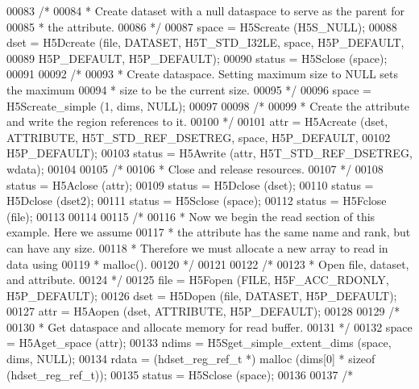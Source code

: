 \begin{DoxyCode}
00083     \textcolor{comment}{/*}
00084 \textcolor{comment}{     * Create dataset with a null dataspace to serve as the parent for}
00085 \textcolor{comment}{     * the attribute.}
00086 \textcolor{comment}{     */}
00087     space = H5Screate (H5S\_NULL);
00088     dset = H5Dcreate (file, DATASET, H5T\_STD\_I32LE, space, H5P\_DEFAULT,
00089                 H5P\_DEFAULT, H5P\_DEFAULT);
00090     status = H5Sclose (space);
00091 
00092     \textcolor{comment}{/*}
00093 \textcolor{comment}{     * Create dataspace.  Setting maximum size to NULL sets the maximum}
00094 \textcolor{comment}{     * size to be the current size.}
00095 \textcolor{comment}{     */}
00096     space = H5Screate\_simple (1, dims, NULL);
00097 
00098     \textcolor{comment}{/*}
00099 \textcolor{comment}{     * Create the attribute and write the region references to it.}
00100 \textcolor{comment}{     */}
00101     attr = H5Acreate (dset, ATTRIBUTE, H5T\_STD\_REF\_DSETREG, space, H5P\_DEFAULT,
00102                     H5P\_DEFAULT);
00103     status = H5Awrite (attr, H5T\_STD\_REF\_DSETREG, wdata);
00104 
00105     \textcolor{comment}{/*}
00106 \textcolor{comment}{     * Close and release resources.}
00107 \textcolor{comment}{     */}
00108     status = H5Aclose (attr);
00109     status = H5Dclose (dset);
00110     status = H5Dclose (dset2);
00111     status = H5Sclose (space);
00112     status = H5Fclose (file);
00113 
00114 
00115     \textcolor{comment}{/*}
00116 \textcolor{comment}{     * Now we begin the read section of this example.  Here we assume}
00117 \textcolor{comment}{     * the attribute has the same name and rank, but can have any size.}
00118 \textcolor{comment}{     * Therefore we must allocate a new array to read in data using}
00119 \textcolor{comment}{     * malloc().}
00120 \textcolor{comment}{     */}
00121 
00122     \textcolor{comment}{/*}
00123 \textcolor{comment}{     * Open file, dataset, and attribute.}
00124 \textcolor{comment}{     */}
00125     file = H5Fopen (FILE, H5F\_ACC\_RDONLY, H5P\_DEFAULT);
00126     dset = H5Dopen (file, DATASET, H5P\_DEFAULT);
00127     attr = H5Aopen (dset, ATTRIBUTE, H5P\_DEFAULT);
00128 
00129     \textcolor{comment}{/*}
00130 \textcolor{comment}{     * Get dataspace and allocate memory for read buffer.}
00131 \textcolor{comment}{     */}
00132     space = H5Aget\_space (attr);
00133     ndims = H5Sget\_simple\_extent\_dims (space, dims, NULL);
00134     rdata = (hdset\_reg\_ref\_t *) malloc (dims[0] * \textcolor{keyword}{sizeof} (hdset\_reg\_ref\_t));
00135     status = H5Sclose (space);
00136 
00137     \textcolor{comment}{/*}

\end{DoxyCode}
